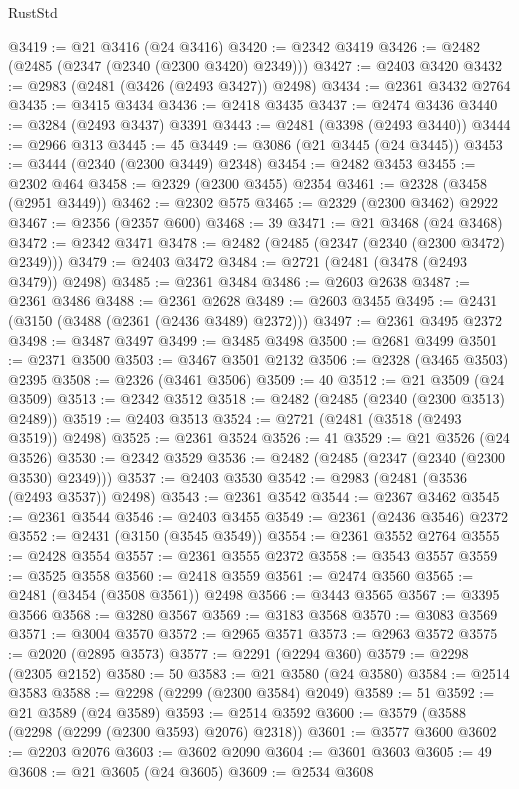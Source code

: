 \begin{lexlean}{RustStd}
\begin{coremodule}
{\begin{coremodule}
{{{{{{{{{{{{{{{{{{{{{{{{{{{{{{{{{{{{{@3419 := @21 @3416 (@24 @3416)
@3420 := @2342 @3419
@3426 := @2482 (@2485 (@2347 (@2340 (@2300 @3420) @2349)))
@3427 := @2403 @3420
@3432 := @2983 (@2481 (@3426 (@2493 @3427)) @2498)
@3434 := @2361 @3432 @2764
@3435 := @3415 @3434
@3436 := @2418 @3435
@3437 := @2474 @3436
@3440 := @3284 (@2493 @3437) @3391
@3443 := @2481 (@3398 (@2493 @3440))
@3444 := @2966 @313
@3445 := 45
@3449 := @3086 (@21 @3445 (@24 @3445))
@3453 := @3444 (@2340 (@2300 @3449) @2348)
@3454 := @2482 @3453
@3455 := @2302 @464
@3458 := @2329 (@2300 @3455) @2354
@3461 := @2328 (@3458 (@2951 @3449))
@3462 := @2302 @575
@3465 := @2329 (@2300 @3462) @2922
@3467 := @2356 (@2357 @600)
@3468 := 39
@3471 := @21 @3468 (@24 @3468)
@3472 := @2342 @3471
@3478 := @2482 (@2485 (@2347 (@2340 (@2300 @3472) @2349)))
@3479 := @2403 @3472
@3484 := @2721 (@2481 (@3478 (@2493 @3479)) @2498)
@3485 := @2361 @3484
@3486 := @2603 @2638
@3487 := @2361 @3486
@3488 := @2361 @2628
@3489 := @2603 @3455
@3495 := @2431 (@3150 (@3488 (@2361 (@2436 @3489) @2372)))
@3497 := @2361 @3495 @2372
@3498 := @3487 @3497
@3499 := @3485 @3498
@3500 := @2681 @3499
@3501 := @2371 @3500
@3503 := @3467 @3501 @2132
@3506 := @2328 (@3465 @3503) @2395
@3508 := @2326 (@3461 @3506)
@3509 := 40
@3512 := @21 @3509 (@24 @3509)
@3513 := @2342 @3512
@3518 := @2482 (@2485 (@2340 (@2300 @3513) @2489))
@3519 := @2403 @3513
@3524 := @2721 (@2481 (@3518 (@2493 @3519)) @2498)
@3525 := @2361 @3524
@3526 := 41
@3529 := @21 @3526 (@24 @3526)
@3530 := @2342 @3529
@3536 := @2482 (@2485 (@2347 (@2340 (@2300 @3530) @2349)))
@3537 := @2403 @3530
@3542 := @2983 (@2481 (@3536 (@2493 @3537)) @2498)
@3543 := @2361 @3542
@3544 := @2367 @3462
@3545 := @2361 @3544
@3546 := @2403 @3455
@3549 := @2361 (@2436 @3546) @2372
@3552 := @2431 (@3150 (@3545 @3549))
@3554 := @2361 @3552 @2764
@3555 := @2428 @3554
@3557 := @2361 @3555 @2372
@3558 := @3543 @3557
@3559 := @3525 @3558
@3560 := @2418 @3559
@3561 := @2474 @3560
@3565 := @2481 (@3454 (@3508 @3561)) @2498
@3566 := @3443 @3565
@3567 := @3395 @3566
@3568 := @3280 @3567
@3569 := @3183 @3568
@3570 := @3083 @3569
@3571 := @3004 @3570
@3572 := @2965 @3571
@3573 := @2963 @3572
@3575 := @2020 (@2895 @3573)
@3577 := @2291 (@2294 @360)
@3579 := @2298 (@2305 @2152)
@3580 := 50
@3583 := @21 @3580 (@24 @3580)
@3584 := @2514 @3583
@3588 := @2298 (@2299 (@2300 @3584) @2049)
@3589 := 51
@3592 := @21 @3589 (@24 @3589)
@3593 := @2514 @3592
@3600 := @3579 (@3588 (@2298 (@2299 (@2300 @3593) @2076) @2318))
@3601 := @3577 @3600
@3602 := @2203 @2076
@3603 := @3602 @2090
@3604 := @3601 @3603
@3605 := 49
@3608 := @21 @3605 (@24 @3605)
@3609 := @2534 @3608
}}}}}}}}}}}}}}}}}}}}}}}}}}}}}}}}}}}}}
\end{coremodule}}
\end{coremodule}
\end{lexlean}
